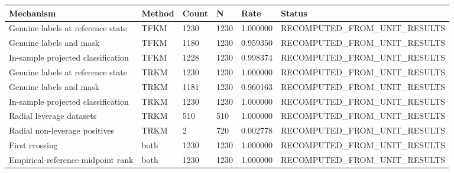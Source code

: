 \begin{tabular}{llllll}
\toprule
Mechanism & Method & Count & N & Rate & Status \\
\midrule
Genuine labels at reference state & TFKM & 1230 & 1230 & 1.000000 & RECOMPUTED\_FROM\_UNIT\_RESULTS \\
Genuine labels and mask & TFKM & 1180 & 1230 & 0.959350 & RECOMPUTED\_FROM\_UNIT\_RESULTS \\
In-sample projected classification & TFKM & 1228 & 1230 & 0.998374 & RECOMPUTED\_FROM\_UNIT\_RESULTS \\
Genuine labels at reference state & TRKM & 1230 & 1230 & 1.000000 & RECOMPUTED\_FROM\_UNIT\_RESULTS \\
Genuine labels and mask & TRKM & 1181 & 1230 & 0.960163 & RECOMPUTED\_FROM\_UNIT\_RESULTS \\
In-sample projected classification & TRKM & 1230 & 1230 & 1.000000 & RECOMPUTED\_FROM\_UNIT\_RESULTS \\
Radial leverage datasets & TRKM & 510 & 510 & 1.000000 & RECOMPUTED\_FROM\_UNIT\_RESULTS \\
Radial non-leverage positives & TRKM & 2 & 720 & 0.002778 & RECOMPUTED\_FROM\_UNIT\_RESULTS \\
First crossing & both & 1230 & 1230 & 1.000000 & RECOMPUTED\_FROM\_UNIT\_RESULTS \\
Empirical-reference midpoint rank & both & 1230 & 1230 & 1.000000 & RECOMPUTED\_FROM\_UNIT\_RESULTS \\
\bottomrule
\end{tabular}
